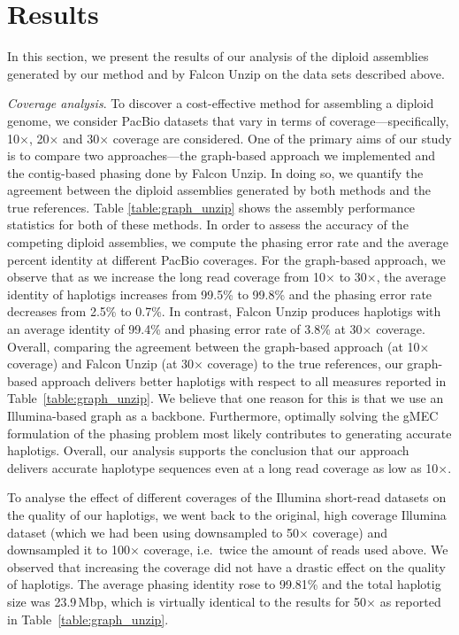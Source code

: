\section{Results}
In this section, we present the results of our analysis of the diploid assemblies generated by our method and by Falcon Unzip on the data sets described above.

\textit{Coverage analysis}. To discover a cost-effective method for assembling a diploid genome, we consider PacBio datasets that vary in terms of coverage---specifically, 10$\times$, 20$\times$ and 30$\times$ coverage are considered.
One of the primary aims of our study is to compare two approaches---the graph-based approach we implemented and the contig-based phasing done by Falcon Unzip. In doing so, we quantify the agreement between the diploid assemblies generated by both methods and the true references.
Table \ref{table:graph_unzip} shows the assembly performance statistics for both of these methods.
In order to assess the accuracy of the competing diploid assemblies, we compute the phasing error rate and the average percent identity at different PacBio coverages.
For the graph-based approach, we observe that as we increase the long read coverage from 10$\times$ to 30$\times$, the average identity of haplotigs increases from 99.5\% to 99.8\% and 
the phasing error rate decreases from 2.5\% to 0.7\%. In contrast, Falcon Unzip produces haplotigs with an average identity of 99.4\% and phasing error rate of 3.8\% at 30$\times$ coverage. 
Overall, comparing the agreement between the graph-based approach (at 10$\times$ coverage) and Falcon Unzip (at 30$\times$ coverage) to the true references, our graph-based approach delivers better haplotigs with respect to all measures reported in Table~\ref{table:graph_unzip}.
We believe that one reason for this is that we use an Illumina-based graph as a backbone.
Furthermore, optimally solving the gMEC formulation of the phasing problem most likely contributes to generating accurate haplotigs.
Overall, our analysis supports the conclusion that our approach delivers accurate haplotype sequences even at a long read coverage as low as 10$\times$.

To analyse the effect of different coverages of the Illumina short-read datasets on the quality of our haplotigs, we went back to the original, high coverage Illumina dataset (which we had been using downsampled to 50$\times$ coverage) and downsampled it to 100$\times$ coverage, i.e.\ twice the amount of reads used above.
We observed that increasing the coverage did not have a drastic effect on the quality of haplotigs.
The average phasing identity rose to 99.81\% and the total haplotig size was 23.9\,Mbp, which is virtually identical to the results for 50$\times$ as reported in Table~\ref{table:graph_unzip}.

